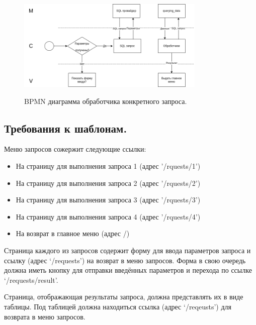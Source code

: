 \documentclass[12pt, a4paper]{article}
\begin{document}
    \begin{figure}[ht!]
    	\centering    %
    	\includegraphics[width=0.8\textwidth]{pictures/requestHandlerBPMN.png}
    	\label{fig:pic5} %
    	\caption{BPMN диаграмма обработчика конкретного запроса.}
    \end{figure}
    
    \subsection{Требования к шаблонам.}
    Меню запросов сожержит следующие ссылки:
    \begin{itemize}
    	\item На страницу для выполнения запроса 1 (адрес '/rquests/1')
    	\item На страницу для выполнения запроса 2 (адрес '/rquests/2')
    	\item На страницу для выполнения запроса 3 (адрес '/rquests/3')
    	\item На страницу для выполнения запроса 4 (адрес '/rquests/4')
    	\item На возврат в главное меню (адрес /)
    \end{itemize}

    Страница каждого из запросов содержит форму для ввода параметров запроса и ссылку
    (адрес ‘/requests’) на возврат в меню запросов. Форма в свою очередь должна иметь кнопку
    для отправки введённых параметров и перехода по ссылке ‘/requests/result’.
    
    Страница, отображающая результаты запроса, должна представлять их в виде таблицы. Под
    таблицей должна находиться ссылка (адрес ‘/reqeusts’) для возврата в меню запросов.
    
\end{document}
